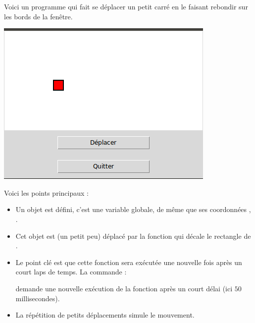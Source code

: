 \documentclass[11pt,class=report,crop=false]{standalone}
\begin{document}
Voici un programme qui fait se déplacer un petit carré en le faisant rebondir sur les bords de la fenêtre.

\begin{center}
\includegraphics[scale=0.5]{../aleatoire/ecran-alea-cours-mouv}
\end{center}

Voici les points principaux :
\begin{itemize}
  \item Un objet  est défini, c'est une variable globale, de même que ses coordonnées , .
  
  \item Cet objet est (un petit peu) déplacé par la fonction  qui décale le rectangle de .
  
  \item Le point clé est que cette fonction sera exécutée une nouvelle fois après un court laps de temps. La commande :\\
  \centerline{}
  demande une nouvelle exécution de la fonction  après un court délai (ici $50$ millisecondes).

  \item La répétition de petits déplacements simule le mouvement.
\end{itemize}
\end{document}
